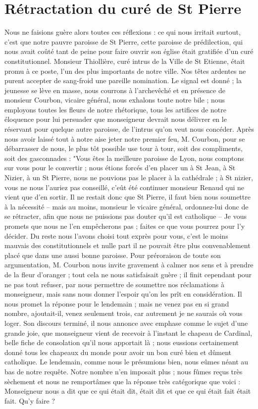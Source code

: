 \documentclass[11pt,a4paper]{report}
\begin{document}
\section*{Rétractation du curé de St Pierre}

Nous ne faisions guère alors toutes ces réflexions : ce qui nous irritait surtout, c'est que notre pauvre paroisse de St Pierre, cette paroisse de prédilection, qui nous avait coûté tant de peine pour faire ouvrir son église était gratifiée d'un curé constitutionnel. Monsieur Thiollière, curé intrus de la Ville de St Etienne, était promu à ce poste, l'un des plus importants de notre ville. Nos têtes ardentes ne purent accepter de sang-froid une pareille nomination. Le signal est donné ; la jeunesse se lève en masse, nous courrons à l'archevêché et en présence de monsieur Courbon, vicaire général, nous exhalons toute notre bile ; nous employons toutes les fleurs de notre rhétorique, tous les artifices de notre éloquence pour lui persuader que monseigneur devrait nous délivrer en le réservant pour quelque autre paroisse, de l'intrus qu'on veut nous concéder. Après nous avoir laissé tout à notre aise jeter notre premier feu, M. Courbon, pour se débarrasser de nous, le plus tôt possible use tour à tour, soit des compliments, soit des gasconnades : "Vous êtes la meilleure paroisse de Lyon, nous comptons sur vous pour le convertir ; nous étions forcés d'en placer un à St Jean, à St Nizier, à un St Pierre, nous ne pouvions pas le placer à la cathédrale ; à St nizier, vous ne nous l'auriez pas conseillé, c'eût été continuer monsieur Renaud qui ne vient que d'en sortir. Il ne restait donc que St Pierre, il faut bien nous soumettre à la nécessité -- mais au moins, monsieur le vicaire général, ordonnez-lui donc de se rétracter, afin que nous ne puissions pas douter qu'il est catholique -- Je vous promets que nous ne l'en empêcherons pas ; faites ce que vous pourrez pour l'y décider. Du reste nous l'avons choisi tout exprès pour vous, c'est le moins mauvais des constitutionnels et nulle part il ne pouvait être plus convenablement placé que dans une aussi bonne paroisse. Pour préroraison de toute son argumentation, M. Courbon nous invite gravement à calmer nos sens et à prendre de la fleur d'oranger ; tout cela ne nous satisfaisait guère ; il finit cependant pour ne pas tout refuser, par nous permettre de soumettre nos réclamations à monseigneur, mais sans nous donner l'espoir qu'on les prît en considération. Il nous promet la réponse pour le lendemain ; mais ne venez pas en si grand nombre, ajoutait-il, venez seulement trois, car autrement je ne saurais où vous loger. Son discours terminé, il nous annonce avec emphase comme le sujet d'une grande joie, que monseigneur vient de recevoir à l'instant le chapeau de Cardinal, belle fiche de consolation qu'il nous apportait là ; nous eussions certainement donné tous les chapeaux du monde pour avoir un bon curé bien et dûment catholique. Le lendemain, comme nous le présumions bien, nous eûmes néant au bas de notre requête. Notre nombre n'en imposait plus ; nous fûmes reçus très sèchement et nous ne remportâmes que la réponse très catégorique que voici : Monseigneur nous a dit que ce qui était dit, était dit et que ce qui était fait était fait. Qu'y faire ? 
\end{document}
